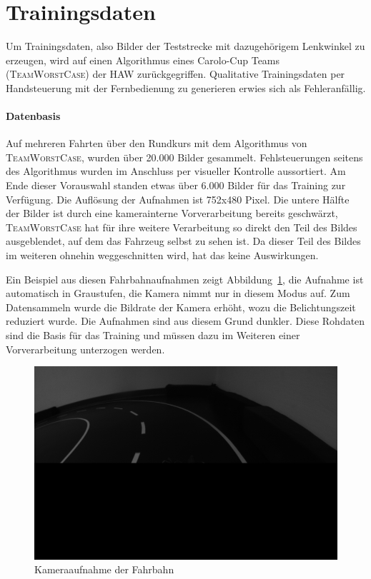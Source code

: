 \section{Trainingsdaten}

Um Trainingsdaten, also Bilder der Teststrecke mit dazugehörigem Lenkwinkel zu erzeugen, wird auf einen Algorithmus eines Carolo-Cup Teams (\textsc{TeamWorstCase}) der HAW zurückgegriffen. Qualitative Trainingsdaten per Handsteuerung mit der Fernbedienung zu generieren erwies sich als Fehleranfällig.

\paragraph{Datenbasis}
Auf mehreren Fahrten über den Rundkurs mit dem Algorithmus von \textsc{TeamWorstCase}, wurden über 20.000 Bilder gesammelt. Fehlsteuerungen seitens des Algorithmus wurden im Anschluss per visueller Kontrolle aussortiert. Am Ende dieser Vorauswahl standen etwas über 6.000 Bilder für das Training zur Verfügung. Die Auflösung der Aufnahmen ist 752x480 Pixel. Die untere Hälfte der Bilder ist durch eine kamerainterne Vorverarbeitung bereits geschwärzt, \textsc{TeamWorstCase} hat für ihre weitere Verarbeitung so direkt den Teil des Bildes ausgeblendet, auf dem das Fahrzeug selbst zu sehen ist. Da dieser Teil des Bildes im weiteren ohnehin weggeschnitten wird, hat das keine Auswirkungen. 

Ein Beispiel aus diesen Fahrbahnaufnahmen zeigt Abbildung~\ref{img:rohbild}, die Aufnahme ist automatisch in Graustufen, die Kamera nimmt nur in diesem Modus auf. Zum Datensammeln wurde die Bildrate der Kamera erhöht, wozu die Belichtungszeit reduziert wurde. Die Aufnahmen sind aus diesem Grund dunkler.
Diese Rohdaten sind die Basis für das Training und müssen dazu im Weiteren einer Vorverarbeitung unterzogen werden. 

\begin{figure}[h]
	\centering
	\includegraphics[scale=0.4]{figures/Rohbild.png}
	\caption{Kameraaufnahme der Fahrbahn}
	\label{img:rohbild}
\end{figure}


